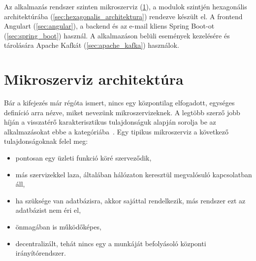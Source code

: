 Az alkalmazás rendszer szinten mikroszerviz (\ref{sec:mikroszerviz}), a modulok szintjén hexagonális architektúrába (\ref{sec:hexagonalis_architektura}) rendezve készült el. A frontend Angulart (\ref{sec:angular}), a backend és az e-mail kliens Spring Boot-ot (\ref{sec:spring_boot}) használ. A alkalmazáson belüli események kezelésére és tárolására Apache Kafkát (\ref{sec:apache_kafka}) használok.


\section{Mikroszerviz architektúra}\label{sec:mikroszerviz}
Bár a kifejezés már régóta ismert, nincs egy központilag elfogadott, egységes definíció arra nézve, miket nevezünk mikroszervizeknek. A legtöbb szerző jobb híján a visszatérő karakterisztikus tulajdonságuk alapján sorolja be az alkalmazásokat ebbe a kategóriába~\cite{OReally_Microservice_Architecture}. Egy tipikus mikroszerviz a következő tulajdonságoknak felel meg:

\begin{itemize}
	\item	pontosan egy üzleti funkció köré szerveződik,
	\item   más	szervizekkel laza, általában hálózaton keresztül megvalósuló kapcsolatban áll,
	\item   ha szüksége van adatbázisra, akkor sajáttal rendelkezik, más rendszer ezt az adatbázist nem éri el,
	\item	önmagában is működőképes,
	\item	decentralizált, tehát nincs egy a munkáját befolyásoló központi irányítórendszer.
\end{itemize}

